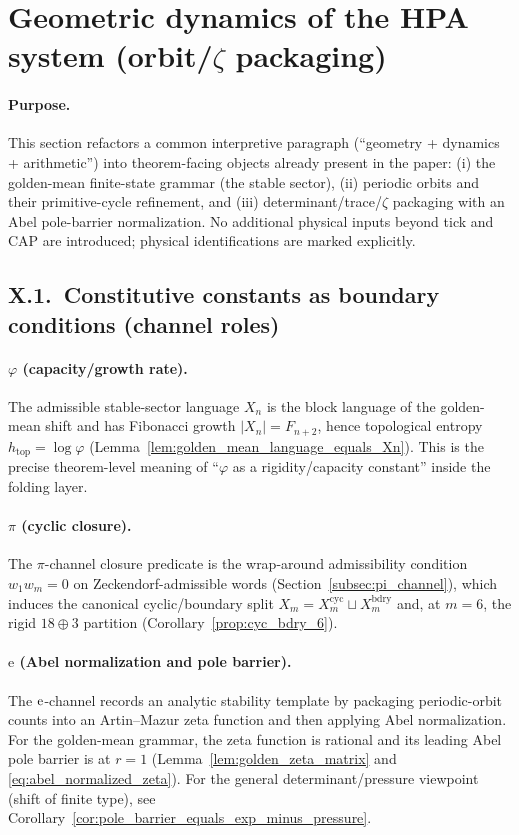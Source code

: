 \section{Geometric dynamics of the HPA system (orbit/\texorpdfstring{$\zeta$}{zeta} packaging)}
\label{sec:hpa_geometric_dynamics_orbit_zeta}

\paragraph{Purpose.}
This section refactors a common interpretive paragraph (``geometry + dynamics + arithmetic'') into theorem-facing objects already present in the paper:
(i) the golden-mean finite-state grammar (the stable sector),
(ii) periodic orbits and their primitive-cycle refinement,
and (iii) determinant/trace/\texorpdfstring{$\zeta$}{zeta} packaging with an Abel pole-barrier normalization.
No additional physical inputs beyond tick and CAP are introduced; physical identifications are marked explicitly.

\subsection{X.1.\ Constitutive constants as boundary conditions (channel roles)}
\label{subsec:x1_constitutive_boundary_conditions}

\paragraph{$\varphi$ (capacity/growth rate).}
\MathTag The admissible stable-sector language $X_n$ is the block language of the golden-mean shift and has Fibonacci growth $|X_n|=F_{n+2}$, hence topological entropy $h_{\mathrm{top}}=\log\varphi$ (Lemma~\ref{lem:golden_mean_language_equals_Xn}).
This is the precise theorem-level meaning of ``$\varphi$ as a rigidity/capacity constant'' inside the folding layer.

\paragraph{$\pi$ (cyclic closure).}
\MathTag The $\pi$-channel closure predicate is the wrap-around admissibility condition $w_1w_m=0$ on Zeckendorf-admissible words (Section~\ref{subsec:pi_channel}),
which induces the canonical cyclic/boundary split $X_m=X_m^{\mathrm{cyc}}\sqcup X_m^{\mathrm{bdry}}$ and, at $m=6$, the rigid $18\oplus 3$ partition (Corollary~\ref{prop:cyc_bdry_6}).

\paragraph{$\mathrm{e}$ (Abel normalization and pole barrier).}
\MathTag The $\mathrm{e}$-channel records an analytic stability template by packaging periodic-orbit counts into an Artin--Mazur zeta function and then applying Abel normalization.
For the golden-mean grammar, the zeta function is rational and its leading Abel pole barrier is at $r=1$ (Lemma~\ref{lem:golden_zeta_matrix} and \eqref{eq:abel_normalized_zeta}).
For the general determinant/pressure viewpoint (shift of finite type), see Corollary~\ref{cor:pole_barrier_equals_exp_minus_pressure}.

